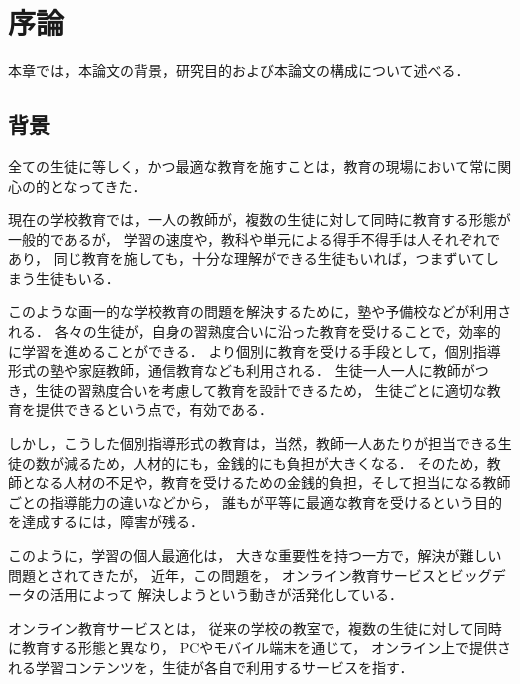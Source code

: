 \chapter{序論}
\label{chap:intro}
\fancyhf{}
\rhead{\thepage}
\cfoot{\thepage}

本章では，本論文の背景，研究目的および本論文の構成について述べる．


\section{背景}

全ての生徒に等しく，かつ最適な教育を施すことは，教育の現場において常に関心の的となってきた．

現在の学校教育では，一人の教師が，複数の生徒に対して同時に教育する形態が一般的であるが，
学習の速度や，教科や単元による得手不得手は人それぞれであり，
同じ教育を施しても，十分な理解ができる生徒もいれば，つまずいてしまう生徒もいる．

このような画一的な学校教育の問題を解決するために，塾や予備校などが利用される．
各々の生徒が，自身の習熟度合いに沿った教育を受けることで，効率的に学習を進めることができる．
より個別に教育を受ける手段として，個別指導形式の塾や家庭教師，通信教育なども利用される．
生徒一人一人に教師がつき，生徒の習熟度合いを考慮して教育を設計できるため，
生徒ごとに適切な教育を提供できるという点で，有効である．

しかし，こうした個別指導形式の教育は，当然，教師一人あたりが担当できる生徒の数が減るため，人材的にも，金銭的にも負担が大きくなる．
そのため，教師となる人材の不足や，教育を受けるための金銭的負担，そして担当になる教師ごとの指導能力の違いなどから，
誰もが平等に最適な教育を受けるという目的を達成するには，障害が残る．


このように，学習の個人最適化は，
大きな重要性を持つ一方で，解決が難しい問題とされてきたが，
近年，この問題を，
オンライン教育サービスとビッグデータの活用によって
解決しようという動きが活発化している．


オンライン教育サービスとは，
従来の学校の教室で，複数の生徒に対して同時に教育する形態と異なり，
PCやモバイル端末を通じて，
オンライン上で提供される学習コンテンツを，生徒が各自で利用するサービスを指す．

